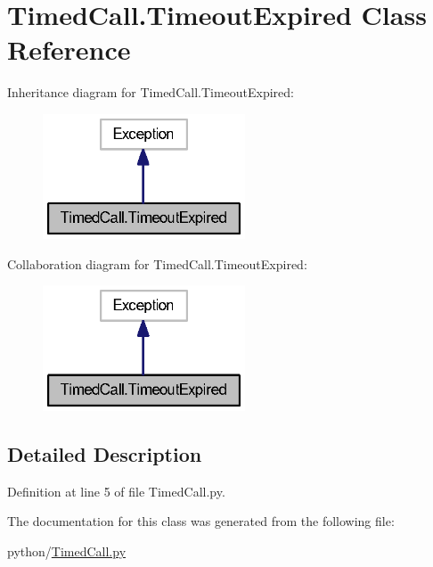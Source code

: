 \section{Timed\-Call.\-Timeout\-Expired Class Reference}
\label{classTimedCall_1_1TimeoutExpired}


Inheritance diagram for Timed\-Call.\-Timeout\-Expired\-:
\nopagebreak
\begin{figure}[H]
\begin{center}
\leavevmode
\includegraphics[width=170pt]{classTimedCall_1_1TimeoutExpired__inherit__graph}
\end{center}
\end{figure}


Collaboration diagram for Timed\-Call.\-Timeout\-Expired\-:
\nopagebreak
\begin{figure}[H]
\begin{center}
\leavevmode
\includegraphics[width=170pt]{classTimedCall_1_1TimeoutExpired__coll__graph}
\end{center}
\end{figure}


\subsection{Detailed Description}


Definition at line 5 of file Timed\-Call.\-py.



The documentation for this class was generated from the following file\-:\begin{DoxyCompactItemize}
\item 
python/\hyperlink{TimedCall_8py}{Timed\-Call.\-py}\end{DoxyCompactItemize}
